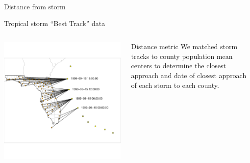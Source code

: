 \documentclass[ignorenonframetext,]{beamer}
\begin{document}
\begin{frame}{Distance from storm}

\large Tropical storm ``Best Track'' data \vspace{-0.7cm}

\begin{columns}
\begin{column}{0.7\textwidth}

\includegraphics[width=\textwidth]{figures/finding_closest_point} 
\end{column}
\begin{column}{0.3\textwidth}
\small
\begin{block}{Distance metric}
We matched storm tracks to county population mean centers to determine the closest approach and date of closest approach of each storm to each county.
\end{block}
\end{column}
\end{columns}

\end{frame}
\end{document}

